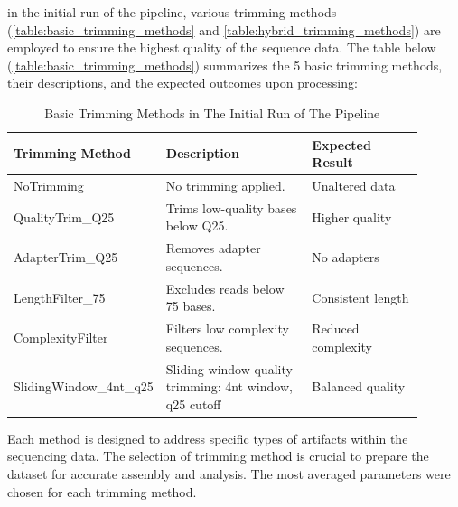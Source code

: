 in the initial run of the pipeline, various \gls{trimming} methods (\autoref{table:basic_trimming_methods} and \autoref{table:hybrid_trimming_methods}) are employed to ensure the highest quality of the sequence data. The table below (\autoref{table:basic_trimming_methods}) summarizes the 5 basic \gls{trimming} methods, their descriptions, and the expected outcomes upon processing:

\begin{table}[ht]
\centering
\begin{tabular}{p{0.2\linewidth} p{0.4\linewidth} p{0.3\linewidth}}
\hline
\textbf{Trimming Method} & \textbf{Description} & \textbf{Expected Result} \\ \hline
NoTrimming & No trimming applied. & Unaltered data \\
QualityTrim\_Q25 & Trims low-quality bases below Q25. & Higher quality \\
AdapterTrim\_Q25 & Removes adapter sequences. & No adapters \\
LengthFilter\_75 & Excludes reads below 75 bases. & Consistent length \\
ComplexityFilter & Filters low complexity sequences. & Reduced complexity \\
SlidingWindow\newline\_4nt\_q25 & Sliding window quality trimming: 4nt window, q25 cutoff & Balanced quality \\
\hline
\end{tabular}
\caption{Basic Trimming Methods in The Initial Run of The Pipeline}
\label{table:basic_trimming_methods}
\end{table}

Each method is designed to address specific types of artifacts within the sequencing data. The selection of \gls{trimming} method is crucial to prepare the dataset for accurate assembly and analysis. The most averaged parameters were chosen for each \gls{trimming} method.

